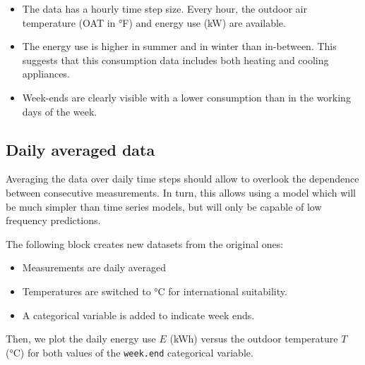 \documentclass[
]{article}
\providecommand{\tightlist}{%
  \setlength{\itemsep}{0pt}\setlength{\parskip}{0pt}}
\begin{document}
\begin{itemize}
\tightlist
\item
  The data has a hourly time step size. Every hour, the outdoor air temperature (OAT in °F) and energy use (kW) are available.
\item
  The energy use is higher in summer and in winter than in-between. This suggests that this consumption data includes both heating and cooling appliances.
\item
  Week-ends are clearly visible with a lower consumption than in the working days of the week.
\end{itemize}

\hypertarget{daily-averaged-data}{%
\subsection{Daily averaged data}\label{daily-averaged-data}}

Averaging the data over daily time steps should allow to overlook the dependence between consecutive measurements. In turn, this allows using a model which will be much simpler than time series models, but will only be capable of low frequency predictions.

The following block creates new datasets from the original ones:

\begin{itemize}
\tightlist
\item
  Measurements are daily averaged
\item
  Temperatures are switched to °C for international suitability.
\item
  A categorical variable is added to indicate week ends.
\end{itemize}

Then, we plot the daily energy use \(E\) (kWh) versus the outdoor temperature \(T\) (°C) for both values of the \texttt{week.end} categorical variable.
\end{document}

